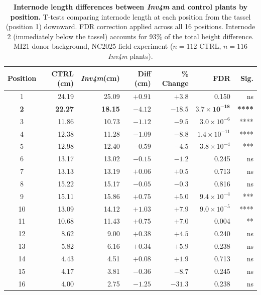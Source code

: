 \documentclass[9pt,twocolumn,twoside]{rilabRxiv}
\newcommand{\invfour}{\textit{Inv4m}\xspace}
\begin{document}
\begin{table}[!ht]
\caption{\textbf{Internode length differences between \invfour and control plants by position.} T-tests comparing internode length at each position from the tassel (position 1) downward. FDR correction applied across all 16 positions. Internode 2 (immediately below the tassel) accounts for 93\% of the total height difference. MI21 donor background, NC2025 field experiment ($n = 112$ CTRL, $n = 116$ \invfour plants).}
\label{tab::internode_effects}
\centering
\small
\begin{tabular}{@{}crrrrrr@{}}
\toprule
\textbf{Position} & \textbf{CTRL (cm)} & \textbf{\invfour (cm)} & \textbf{Diff (cm)} & \textbf{\% Change} & \textbf{FDR} & \textbf{Sig.} \\
\midrule
1 & 24.19 & 25.09 & $+0.91$ & $+3.8$ & 0.150 & ns \\
\textbf{2} & \textbf{22.27} & \textbf{18.15} & $\mathbf{-4.12}$ & $\mathbf{-18.5}$ & $\mathbf{3.7 \times 10^{-18}}$ & \textbf{****} \\
3 & 11.86 & 10.73 & $-1.12$ & $-9.5$ & $3.0 \times 10^{-6}$ & **** \\
4 & 12.38 & 11.28 & $-1.09$ & $-8.8$ & $1.4 \times 10^{-11}$ & **** \\
5 & 12.98 & 12.40 & $-0.59$ & $-4.5$ & $3.8 \times 10^{-4}$ & *** \\
6 & 13.17 & 13.02 & $-0.15$ & $-1.2$ & 0.245 & ns \\
7 & 13.13 & 13.19 & $+0.06$ & $+0.5$ & 0.713 & ns \\
8 & 15.22 & 15.17 & $-0.05$ & $-0.3$ & 0.816 & ns \\
9 & 15.11 & 15.86 & $+0.75$ & $+5.0$ & $9.4 \times 10^{-4}$ & *** \\
10 & 13.09 & 14.12 & $+1.03$ & $+7.9$ & $9.0 \times 10^{-5}$ & **** \\
11 & 10.68 & 11.43 & $+0.75$ & $+7.0$ & 0.004 & ** \\
12 & 8.62 & 9.00 & $+0.38$ & $+4.5$ & 0.240 & ns \\
13 & 5.82 & 6.16 & $+0.34$ & $+5.9$ & 0.238 & ns \\
14 & 4.43 & 4.51 & $+0.08$ & $+1.9$ & 0.713 & ns \\
15 & 4.17 & 3.81 & $-0.36$ & $-8.7$ & 0.245 & ns \\
16 & 4.00 & 2.75 & $-1.25$ & $-31.3$ & 0.238 & ns \\
\bottomrule
\end{tabular}
\end{table}
\end{document}
